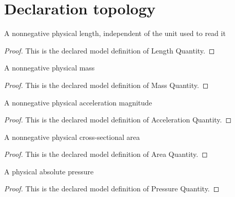 \section{Declaration topology}
\begin{definition}
  \label{def:physics:phyx-mini-0395:phyxminiproblems-problemphyxmini0395-lengthquantity}
  A nonnegative physical length, independent of the unit used to read it
\end{definition}
\begin{proof}
  This is the declared model definition of Length Quantity.
\end{proof}
\begin{definition}
  \label{def:physics:phyx-mini-0395:phyxminiproblems-problemphyxmini0395-massquantity}
  A nonnegative physical mass
\end{definition}
\begin{proof}
  This is the declared model definition of Mass Quantity.
\end{proof}
\begin{definition}
  \label{def:physics:phyx-mini-0395:phyxminiproblems-problemphyxmini0395-accelerationquantity}
  A nonnegative physical acceleration magnitude
\end{definition}
\begin{proof}
  This is the declared model definition of Acceleration Quantity.
\end{proof}
\begin{definition}
  \label{def:physics:phyx-mini-0395:phyxminiproblems-problemphyxmini0395-areaquantity}
  A nonnegative physical cross-sectional area
\end{definition}
\begin{proof}
  This is the declared model definition of Area Quantity.
\end{proof}
\begin{definition}
  \label{def:physics:phyx-mini-0395:phyxminiproblems-problemphyxmini0395-pressurequantity}
  A physical absolute pressure
\end{definition}
\begin{proof}
  This is the declared model definition of Pressure Quantity.
\end{proof}
